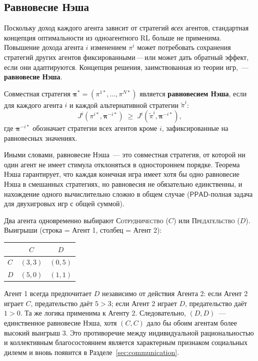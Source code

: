 \subsection{Равновесие Нэша}

Поскольку доход каждого агента зависит от стратегий \emph{всех}
агентов, стандартная концепция оптимальности из одноагентного RL
больше не применима. Повышение дохода агента $i$ изменением $\pi^i$ может
потребовать сохранения стратегий других агентов фиксированными\,---\,или может
дать обратный эффект, если они адаптируются. Концепция решения, заимствованная из теории игр,~---
\textbf{равновесие Нэша}.

\begin{definition}
\label{def:nash}
Совместная стратегия $\boldsymbol{\pi}^* = (\pi^{1*}, \ldots, \pi^{N*})$
является \textbf{равновесием Нэша}, если для каждого агента $i$ и каждой
альтернативной стратегии $\tilde\pi^i$:
\[
  J^i(\pi^{i*}, \boldsymbol{\pi}^{-i*}) \;\geq\;
  J^i(\tilde\pi^i, \boldsymbol{\pi}^{-i*}),
\]
где $\boldsymbol{\pi}^{-i*}$ обозначает стратегии всех агентов
кроме $i$, зафиксированные на равновесных значениях.
\end{definition}

Иными словами, равновесие Нэша~--- это совместная стратегия, от которой ни один
агент не имеет стимула отклоняться в одностороннем порядке. Теорема Нэша
гарантирует, что каждая конечная игра имеет хотя бы одно равновесие Нэша
в смешанных стратегиях, но равновесия не обязательно единственны, и нахождение
одного вычислительно сложно в общем случае ($\mathsf{PPAD}$-полная задача для
двухигровых игр с общей суммой).

\begin{example}
\label{ex:prisoners}
Два агента одновременно выбирают \textsc{Сотрудничество} ($C$) или
\textsc{Предательство} ($D$). Выигрыши (строка = Агент 1, столбец = Агент 2):
\begin{center}
\small
\begin{tabular}{@{}lcc@{}}
\toprule
 & $C$ & $D$ \\
\midrule
$C$ & $(3,3)$ & $(0,5)$ \\
$D$ & $(5,0)$ & $(1,1)$ \\
\bottomrule
\end{tabular}
\end{center}
Агент 1 всегда предпочитает $D$ независимо от действия Агента 2: если Агент 2
играет $C$, предательство даёт $5 > 3$; если Агент 2 играет $D$, предательство
даёт $1 > 0$. Та же логика применима к Агенту 2. Следовательно, $(D, D)$~---
единственное равновесие Нэша, хотя $(C, C)$ дало бы обоим
агентам более высокий выигрыш $3$. Это противоречие между индивидуальной
рациональностью и коллективным благосостоянием является характерным признаком социальных
дилемм и вновь появится в
Разделе~\ref{sec:communication}.
\end{example}

